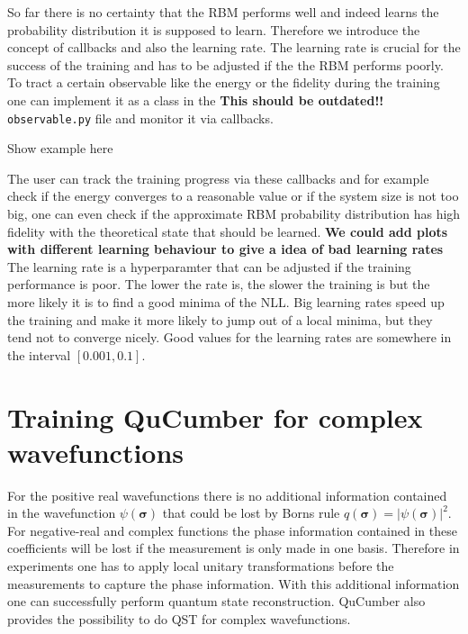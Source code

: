 \documentclass[submission, Phys]{SciPost}
\begin{document}
So far there is no certainty that the RBM performs well and indeed learns the probability distribution it is supposed to learn. Therefore we introduce the concept of callbacks and also the learning rate. The learning rate is crucial for the success of the training and has to be adjusted if the the RBM performs poorly.
To tract a certain observable like the energy or the fidelity during the training one can implement it as a class in the \textbf{This should be outdated!!} \verb|observable.py| file and monitor it via callbacks.

\begin{python}
Show example here
\end{python}

The user can track the training progress via these callbacks and for example check if the energy converges to a reasonable value or if the system size is not too big, one can even check if the approximate RBM probability distribution has high fidelity with the theoretical state that should be learned.
\textbf{We could add plots with different learning behaviour to give a idea of bad learning rates}
The learning rate is a hyperparamter that can be adjusted if the training performance is poor. The lower the rate is, the slower the training is but the more likely it is to find a good minima of the NLL. Big learning rates speed up the training and make it more likely to jump out of a local minima, but they tend not to converge nicely. Good values for the learning rates are somewhere in the interval $[0.001, 0.1 ]$.

\section{Training QuCumber for complex wavefunctions}
\label{Sec:Training_QuCumber_on_complex_wavefunctions}

For the positive real wavefunctions there is no additional information contained in the wavefunction $\psi( \boldsymbol{\sigma})$ that could be lost by Borns rule $q(\boldsymbol{\sigma}) = | \psi( \boldsymbol{\sigma} ) |^2$. For negative-real and complex functions the phase information contained in these coefficients will be lost if the measurement is only made in one basis. Therefore in experiments one has to apply local unitary transformations before the measurements to capture the phase information. With this additional information one can successfully perform quantum state reconstruction.
QuCumber also provides the possibility to do QST for complex wavefunctions.
\end{document}
